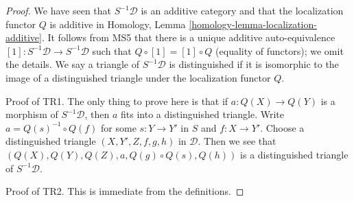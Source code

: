 \begin{proof}

We have seen that $S^{-1}\mathcal{D}$ is an additive category
and that the localization functor $Q$ is additive in
Homology, Lemma \ref{homology-lemma-localization-additive}.
It follows from MS5 that there is a unique additive auto-equivalence
$[1] : S^{-1}\mathcal{D} \to S^{-1}\mathcal{D}$
such that $Q \circ [1] = [1] \circ Q$ (equality of functors);
we omit the details. We say a triangle of $S^{-1}\mathcal{D}$
is distinguished if it is isomorphic to the image of a
distinguished triangle under the localization functor $Q$.

\medskip\noindent
Proof of TR1. The only thing to prove here is that if
$a : Q(X) \to Q(Y)$ is a morphism of $S^{-1}\mathcal{D}$, then
$a$ fits into a distinguished triangle. Write $a = Q(s)^{-1} \circ Q(f)$ for
some $s : Y \to Y'$ in $S$ and $f : X \to Y'$. Choose a distinguished
triangle $(X, Y', Z, f, g, h)$ in $\mathcal{D}$. Then we see that
$(Q(X), Q(Y), Q(Z), a, Q(g) \circ Q(s), Q(h))$ is a distinguished triangle
of $S^{-1}\mathcal{D}$.

\medskip\noindent
Proof of TR2. This is immediate from the definitions.


\end{proof}
